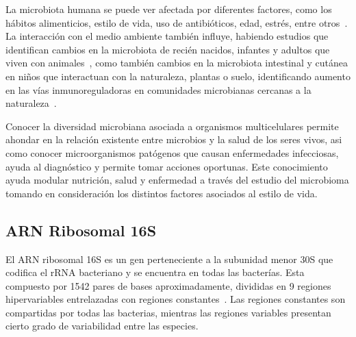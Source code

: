 La microbiota humana se puede ver afectada por diferentes factores, como los hábitos alimenticios, estilo de vida, uso de antibióticos, edad, estrés, entre otros~\cite{altvecs2020interaction}. 
La interacción con el medio ambiente también influye, habiendo estudios que identifican cambios en la microbiota de recién nacidos, infantes y adultos que viven con animales~\cite{tun2017exposure, azad2013infant,kates2020household}, como también cambios en la microbiota intestinal y cutánea en niños que interactuan con la naturaleza, plantas o suelo, identificando aumento en las vías inmunoreguladoras en comunidades microbianas cercanas a la naturaleza~\cite{roslund2020biodiversity}.




Conocer la diversidad microbiana asociada a organismos multicelulares permite ahondar en la relación existente entre microbios y la salud de los seres vivos, asi como conocer microorganismos patógenos que causan enfermedades infecciosas, ayuda al diagnóstico y permite tomar acciones oportunas. 
Este conocimiento ayuda modular nutrición, salud y enfermedad a través del estudio del microbioma tomando en consideración los distintos factores asociados al estilo de vida.
\subsection{ARN Ribosomal 16S}
El ARN ribosomal 16S es un gen perteneciente a la subunidad menor 30S que codifica el rRNA bacteriano y se encuentra en todas las bacterías. 
Esta compuesto por 1542 pares de bases aproximadamente, divididas en 9 regiones hipervariables entrelazadas con regiones constantes~\cite{clarridge2004impact}.
Las regiones constantes son compartidas por todas las bacterias, mientras las regiones variables presentan cierto grado de variabilidad entre las especies. 



